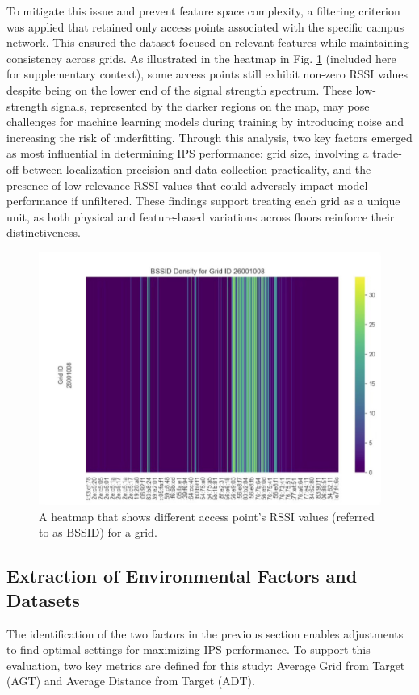 \documentclass[runningheads]{llncs}
\begin{document}
To mitigate this issue and prevent feature space complexity, a filtering criterion was applied that retained only access points associated with the specific campus network. This ensured the dataset focused on relevant features while maintaining consistency across grids.
As illustrated in the heatmap in Fig. \ref{fig:heatmap008} (included here for supplementary context), some access points still exhibit non-zero RSSI values despite being on the lower end of the signal strength spectrum. These low-strength signals, represented by the darker regions on the map, may pose challenges for machine learning models during training by introducing noise and increasing the risk of underfitting.
Through this analysis, two key factors emerged as most influential in determining IPS performance: grid size, involving a trade-off between localization precision and data collection practicality, and the presence of low-relevance RSSI values that could adversely impact model performance if unfiltered. These findings support treating each grid as a unique unit, as both physical and feature-based variations across floors reinforce their distinctiveness.

\begin{figure}[htbp]
	\centerline{\includegraphics[scale=0.15]{meth3.jpg}}
	\caption{A heatmap that shows different access point’s RSSI values (referred to as BSSID) for a grid.}
	\label{fig:heatmap008}
\end{figure}

\subsection{Extraction of Environmental Factors and Datasets}
The identification of the two factors in the previous section enables adjustments to find optimal settings for maximizing IPS performance. 
To support this evaluation, two key metrics are defined for this study: Average Grid from Target (AGT) and Average Distance from Target (ADT).
\end{document}
